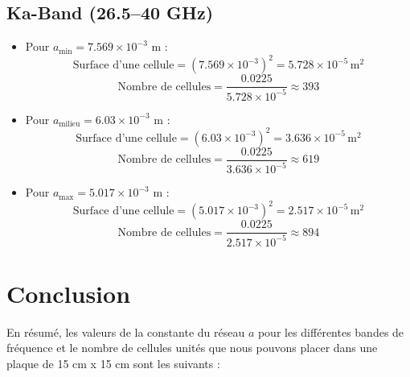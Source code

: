 \documentclass{article}
\begin{document}
\subsection{Ka-Band (26.5–40 GHz)}
\begin{itemize}
    \item Pour \( a_{\text{min}} = 7.569 \times 10^{-3} \) m :
    \[
    \text{Surface d'une cellule} = (7.569 \times 10^{-3})^2 = 5.728 \times 10^{-5} \, \text{m}^2
    \]
    \[
    \text{Nombre de cellules} = \frac{0.0225}{5.728 \times 10^{-5}} \approx 393
    \]

    \item Pour \( a_{\text{milieu}} = 6.03 \times 10^{-3} \) m :
    \[
    \text{Surface d'une cellule} = (6.03 \times 10^{-3})^2 = 3.636 \times 10^{-5} \, \text{m}^2
    \]
    \[
    \text{Nombre de cellules} = \frac{0.0225}{3.636 \times 10^{-5}} \approx 619
    \]

    \item Pour \( a_{\text{max}} = 5.017 \times 10^{-3} \) m :
    \[
    \text{Surface d'une cellule} = (5.017 \times 10^{-3})^2 = 2.517 \times 10^{-5} \, \text{m}^2
    \]
    \[
    \text{Nombre de cellules} = \frac{0.0225}{2.517 \times 10^{-5}} \approx 894
    \]
\end{itemize}


\section{Conclusion}
En résumé, les valeurs de la constante du réseau \( a \) pour les différentes bandes de fréquence et le nombre de cellules unités que nous pouvons placer dans une plaque de 15 cm x 15 cm sont les suivants :
\end{document}
